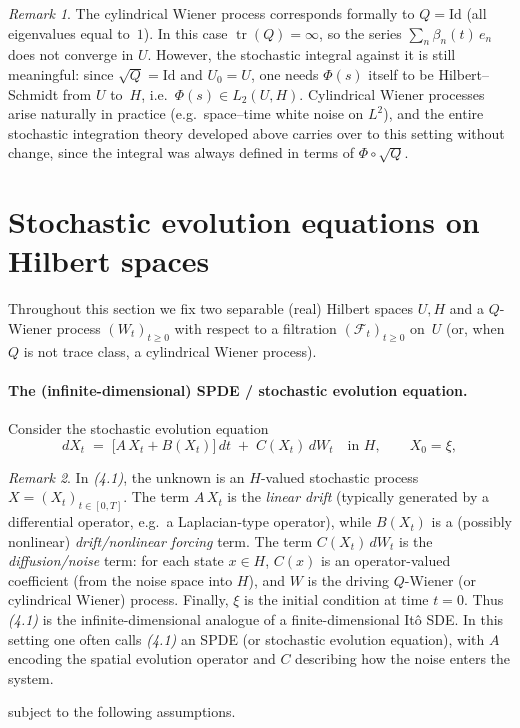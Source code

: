 \documentclass[11pt]{article}
\theoremstyle{definition}
\theoremstyle{remark}
\newtheorem{remark}{Remark}
\DeclareMathOperator{\tr}{tr}
\begin{document}
\begin{remark}
The cylindrical Wiener process corresponds formally to $Q = \mathrm{Id}$
(all eigenvalues equal to~$1$).  In this case $\tr(Q) = \infty$, so the
series $\sum_n \beta_n(t)\,e_n$ does not converge in $U$.
However, the stochastic integral against it is still meaningful: since
$\sqrt{Q} = \mathrm{Id}$ and $U_0=U$, one needs $\Phi(s)$ itself to be
Hilbert--Schmidt from $U$ to~$H$, i.e.\ $\Phi(s) \in L_2(U,H)$.
Cylindrical Wiener processes arise naturally in practice (e.g.\ space--time
white noise on $L^2$), and the entire stochastic integration theory
developed above carries over to this setting without change, since the
integral was always defined in terms of $\Phi \circ \sqrt{Q}$.
\end{remark}

\section*{Stochastic evolution equations on Hilbert spaces}

Throughout this section we fix two separable (real) Hilbert spaces $U,H$ and a
$Q$-Wiener process $(W_t)_{t\ge 0}$ with respect to a filtration $(\mathcal{F}_t)_{t\ge 0}$
on~$U$ (or, when $Q$ is not trace class, a cylindrical Wiener process).

\paragraph{The (infinite-dimensional) SPDE / stochastic evolution equation.}
Consider the stochastic evolution equation
\begin{equation}\label{eq:spde}\tag{4.1}
		    dX_t
		    \;=\;
		    \bigl[A\,X_t + B(X_t)\bigr]\,dt
		    \;+\;
	    C(X_t)\,dW_t
	    \quad\text{in } H,
	    \qquad
	    X_0 = \xi,
\end{equation}
\begin{remark}
In \emph{(4.1)}, the unknown is an $H$-valued stochastic process
$X=(X_t)_{t\in[0,T]}$.  The term $A\,X_t$ is the \emph{linear drift}
(typically generated by a differential operator, e.g.\ a Laplacian-type
operator), while $B(X_t)$ is a (possibly nonlinear) \emph{drift/nonlinear
forcing} term.  The term $C(X_t)\,dW_t$ is the \emph{diffusion/noise} term:
for each state $x\in H$, $C(x)$ is an operator-valued coefficient (from the
noise space into $H$), and $W$ is the driving $Q$-Wiener (or cylindrical
Wiener) process.  Finally, $\xi$ is the initial condition at time $t=0$.
Thus \emph{(4.1)} is the infinite-dimensional analogue of a finite-dimensional
It\^o SDE. In this setting one often calls \emph{(4.1)} an SPDE (or stochastic
evolution equation), with $A$ encoding the spatial evolution operator and $C$
describing how the noise enters the system.
\end{remark}
subject to the following assumptions.
\end{document}

